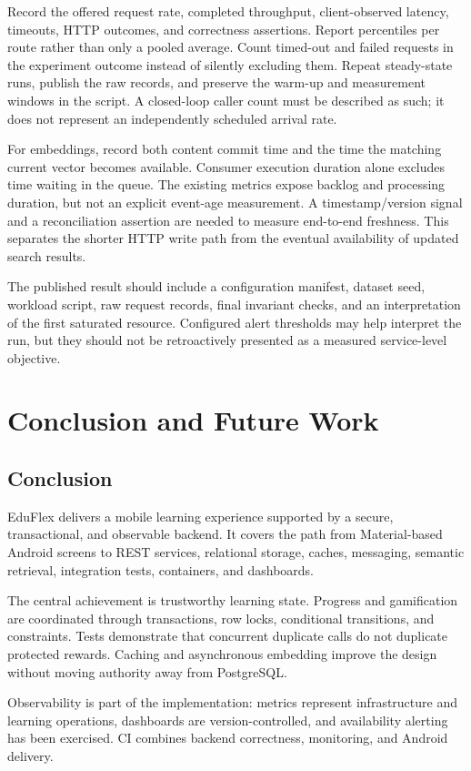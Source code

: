 \documentclass[12pt,a4paper,oneside]{report}
\begin{document}
Record the offered request rate, completed throughput, client-observed latency,
timeouts, HTTP outcomes, and correctness assertions. Report percentiles per route
rather than only a pooled average. Count timed-out and failed requests in the
experiment outcome instead of silently excluding them. Repeat steady-state runs,
publish the raw records, and preserve the warm-up and measurement windows in the
script. A closed-loop caller count must be described as such; it does not represent
an independently scheduled arrival rate.

For embeddings, record both content commit time and the time the matching current
vector becomes available. Consumer execution duration alone excludes time waiting
in the queue. The existing metrics expose backlog and processing duration, but not
an explicit event-age measurement. A timestamp/version signal and a reconciliation
assertion are needed to measure end-to-end freshness. This separates the shorter
HTTP write path from the eventual availability of updated search results.

The published result should include a configuration manifest, dataset seed, workload
script, raw request records, final invariant checks, and an interpretation of the
first saturated resource. Configured alert thresholds may help interpret the run,
but they should not be retroactively presented as a measured service-level objective.

\chapter{Conclusion and Future Work}
\section{Conclusion}
EduFlex delivers a mobile learning experience supported by a secure, transactional,
and observable backend. It covers the path from Material-based Android screens to
REST services, relational storage, caches, messaging, semantic retrieval, integration
tests, containers, and dashboards.

The central achievement is trustworthy learning state. Progress and gamification are
coordinated through transactions, row locks, conditional transitions, and constraints.
Tests demonstrate that concurrent duplicate calls do not duplicate protected rewards.
Caching and asynchronous embedding improve the design without moving authority away
from PostgreSQL.

Observability is part of the implementation: metrics represent infrastructure and
learning operations, dashboards are version-controlled, and availability alerting
has been exercised. CI combines backend correctness, monitoring, and Android delivery.
\end{document}
